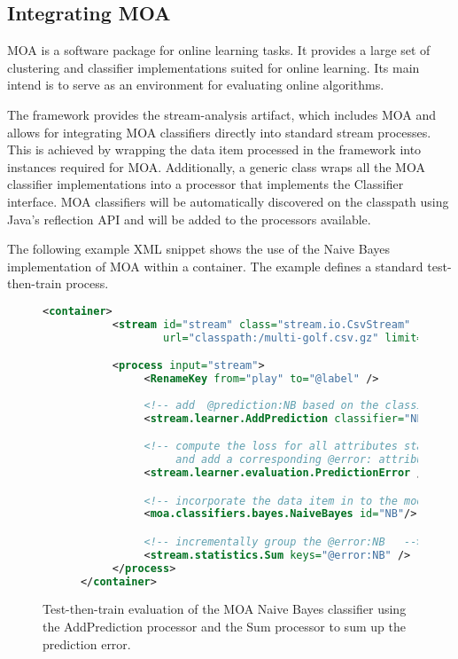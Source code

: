 \subsection{\label{sec:moa}Integrating MOA}

MOA is a software package for online learning tasks. It provides a
large set of clustering and classifier implementations suited for
online learning. Its main intend is to serve as an environment for
evaluating online algorithms.

The \streams framework provides the {\ttfamily stream-analysis}
artifact, which includes MOA and allows for integrating MOA
classifiers directly into standard stream processes. This is achieved
by wrapping the data item processed in the \streams framework into
instances required for MOA. Additionally, a generic class wraps all
the MOA classifier implementations into a processor that implements
the {\ttfamily Classifier} interface. MOA classifiers will be
automatically discovered on the classpath using Java's reflection API
and will be added to the processors available.

The following example XML snippet shows the use of the Naive Bayes
implementation of MOA within a \streams container. The example defines
a standard test-then-train process.


\begin{figure}[h!]
  \centering
  \begin{lstlisting}[language=XML]
      <container>
           <stream id="stream" class="stream.io.CsvStream"
                   url="classpath:/multi-golf.csv.gz" limit="100"/>

           <process input="stream">
                <RenameKey from="play" to="@label" />
        
                <!-- add  @prediction:NB based on the classifier "NB"  -->
                <stream.learner.AddPrediction classifier="NB" />

                <!-- compute the loss for all attributes starting with @prediction:
                     and add a corresponding @error: attribute with the loss   -->
                <stream.learner.evaluation.PredictionError />

                <!-- incorporate the data item in to the model (learning)  -->
                <moa.classifiers.bayes.NaiveBayes id="NB"/>

                <!-- incrementally group the @error:NB   -->
                <stream.statistics.Sum keys="@error:NB" />
           </process>
      </container>
  \end{lstlisting}
  \caption{\label{fig:testThenTraing}Test-then-train evaluation of the
    MOA Naive Bayes classifier using the {\ttfamily AddPrediction}
    processor and the {\ttfamily Sum} processor to sum up the
    prediction error.}
\end{figure}

